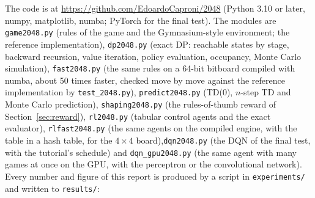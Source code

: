 \documentclass[11pt,a4paper]{article}
\theoremstyle{remark}
\begin{document}
The code is at \url{https://github.com/EdoardoCaproni/2048} (Python 3.10 or later, numpy, matplotlib, numba; PyTorch for the final test). The modules are \texttt{game2048.py} (rules of the game and the Gymnasium-style environment; the reference implementation), \texttt{dp2048.py} (exact DP: reachable states by stage, backward recursion, value iteration, policy evaluation, occupancy, Monte Carlo simulation), \texttt{fast2048.py} (the same rules on a 64-bit bitboard compiled with numba, about 50 times faster, checked move by move against the reference implementation by \texttt{test\_2048.py}), \texttt{predict2048.py} (TD(0), $n$-step TD and Monte Carlo prediction), \texttt{shaping2048.py} (the rules-of-thumb reward of Section~\ref{sec:reward}), \texttt{rl2048.py} (tabular control agents and the exact evaluator), \texttt{rlfast2048.py} (the same agents on the compiled engine, with the table in a hash table, for the $4\times4$ board),\texttt{dqn2048.py} (the DQN of the final test, with the tutorial's schedule) and \texttt{dqn\_gpu2048.py} (the same agent with many games at once on the GPU, with the perceptron or the convolutional network). Every number and figure of this report is produced by a script in \texttt{experiments/} and written to \texttt{results/}:
\end{document}
